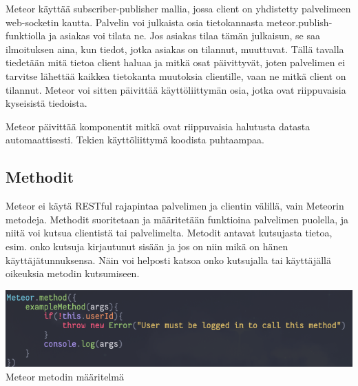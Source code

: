 \medskip

Meteor käyttää subscriber-publisher mallia, jossa client on yhdistetty palvelimeen web-socketin kautta. 
%
Palvelin voi julkaista osia tietokannasta meteor.publish-funktiolla ja asiakas voi tilata ne. Jos asiakas tilaa tämän julkaisun, se saa ilmoituksen aina, kun tiedot, jotka asiakas on tilannut, muuttuvat.
Tällä tavalla tiedetään mitä tietoa client haluaa ja mitkä osat päivittyvät, joten palvelimen ei tarvitse lähettää kaikkea tietokanta muutoksia clientille, vaan ne mitkä client on tilannut.
Meteor voi sitten päivittää käyttöliittymän osia, jotka ovat riippuvaisia kyseisistä tiedoista. 



\medskip

Meteor päivittää komponentit mitkä ovat riippuvaisia halutusta datasta automaattisesti. Tekien käyttöliittymä koodista puhtaampaa.


\medskip



\subsection*{Methodit}

Meteor ei käytä RESTful rajapintaa palvelimen ja clientin välillä, vain Meteorin metodeja.
Methodit suoritetaan ja määritetään funktioina palvelimen puolella, ja niitä voi kutsua clientistä tai palvelimelta.
Metodit antavat kutsujasta tietoa, esim. onko kutsuja kirjautunut sisään ja jos on niin mikä on hänen käyttäjätunnuksensa. 
Näin voi helposti katsoa onko kutsujalla tai käyttäjällä oikeuksia metodin kutsumiseen.
\medskip



\includegraphics[width=15cm]{src/public/methodexample.png}\\
Meteor metodin määritelmä
\medskip

